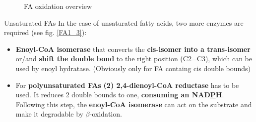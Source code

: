 \documentclass[../main.tex]{subfiles}
\begin{document}
\begin{figure}[H]
	\centering
	\hfil
	\caption{FA oxidation overview}
\end{figure}

\begin{RemarkWithTitel}{Unsaturated FAs}
 	In the case of unsaturated fatty acids, two more enzymes are required (see fig. \ref{FA1_3}): 
 	\begin{itemize}
 		\item \textbf{Enoyl-CoA isomerase} that converts the \textbf{cis-isomer into a trans-isomer} or/and \textbf{shift the double bond} to the right position (C2=C3), which can be used by enoyl hydratase. (Obviously only for FA containg cis double bounds)
 		\item For \textbf{polyunsaturated FAs} \textbf{(2) 2,4-dienoyl-CoA reductase} has to be used. It reduces 2 double bounds to one, \textbf{consuming an NAD\underline{P}H}. Following this step, the \textbf{enoyl-CoA isomerase} can act on the substrate and make it degradable by $\beta$-oxidation.
 	\end{itemize}

\end{RemarkWithTitel}
\end{document}
